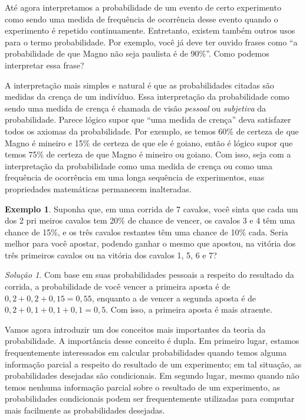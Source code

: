\documentclass[]{book}
\theoremstyle{definition}
\theoremstyle{definition}
\newtheorem{example}{Exemplo}[chapter]
\theoremstyle{definition}
\theoremstyle{remark}
\newtheorem*{solution}{Solução}
\begin{document}
Até agora interpretamos a probabilidade de um evento de certo experimento como sendo uma medida de frequência de ocorrência desse evento quando o experimento é repetido continuamente.
Entretanto, existem também outros usos para o termo probabilidade.
Por exemplo, você já deve ter ouvido frases como ``a probabilidade de que Magno não seja paulista é de 90\%''.
Como podemos interpretar essa frase?

A interpretação mais simples e natural é que as probabilidades citadas são medidas da crença de um indivíduo.
Essa interpretação da probabilidade como sendo uma medida de crença é chamada de visão \emph{pessoal} ou \emph{subjetiva} da probabilidade.
Parece lógico supor que ``uma medida de crença'' deva satisfazer todos os axiomas da probabilidade.
Por exemplo, se temos 60\% de certeza de que Magno é mineiro e 15\% de certeza de que ele é goiano, então é lógico supor que temos 75\% de certeza de que Magno é mineiro ou goiano.
Com isso, seja com a interpretação da probabilidade como uma medida de crença ou como uma frequência de ocorrência em uma longa sequência de experimentos, suas propriedades matemáticas permanecem inalteradas.

\begin{example}
\protect\hypertarget{exm:unnamed-chunk-144}{}{\label{exm:unnamed-chunk-144} }Suponha que, em uma corrida de 7 cavalos, você sinta que cada um dos 2 pri meiros cavalos tem 20\% de chance de vencer, os cavalos 3 e 4 têm uma chance de 15\%, e os três cavalos restantes têm uma chance de 10\% cada.
Seria melhor para você apostar, podendo ganhar o mesmo que apostou, na vitória dos três primeiros cavalos ou na vitória dos cavalos 1, 5, 6 e 7?
\end{example}

\begin{solution}
\iffalse{} {Solução. } \fi{}Com base em suas probabilidades pessoais a respeito do resultado da corrida, a probabilidade de você vencer a primeira aposta é de \(0{,}2 + 0{,}2 +0{,}15 = 0{,}55\), enquanto a de vencer a segunda aposta é de \(0{,}2 + 0{,}1 +0{,}1 + 0{,}1=0{,}5.\)
Com isso, a primeira aposta é mais atraente.
\end{solution}

Vamos agora introduzir um dos conceitos mais importantes da teoria da probabilidade. A importância desse conceito é dupla.
Em primeiro lugar, estamos frequentemente interessados em calcular probabilidades quando temos alguma informação parcial a respeito do resultado de um experimento; em tal situação, as probabilidades desejadas são condicionais.
Em segundo lugar, mesmo quando não temos nenhuma informação parcial sobre o resultado de um experimento, as probabilidades condicionais podem ser frequentemente utilizadas para computar mais facilmente as probabilidades desejadas.
\end{document}
